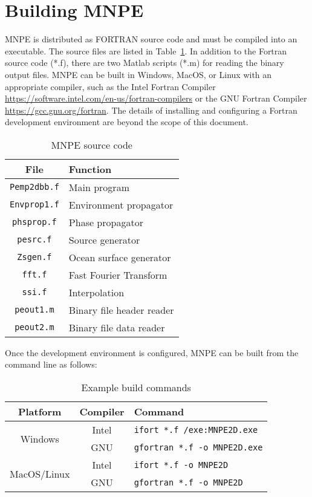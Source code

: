 \section{Building MNPE}

MNPE is distributed as FORTRAN source code and must be compiled into an executable. The source files are listed in Table~\ref{tab:sourcecode}. In addition to the Fortran source code (*.f), there are two Matlab scripts (*.m) for reading the binary output files. MNPE can be built in Windows, MacOS, or Linux with an appropriate compiler, such as the Intel Fortran Compiler \url{https://software.intel.com/en-us/fortran-compilers} or the GNU Fortran Compiler \url{https://gcc.gnu.org/fortran}. The details of installing and configuring a Fortran development environment are beyond the scope of this document.

\begin{table}[!ht]
	\begin{center}
		\caption{MNPE source code}
		\label{tab:sourcecode}
		\begin{tabular}{c|l}
			\textbf{File} & \textbf{Function} \\
			\hline
			\texttt{Pemp2dbb.f} & Main program \\
    		\texttt{Envprop1.f} & Environment propagator \\
    		\texttt{phsprop.f} & Phase propagator \\
    		\texttt{pesrc.f} & Source generator \\
    		\texttt{Zsgen.f} & Ocean surface generator \\
    		\texttt{fft.f} & Fast Fourier Transform \\
    		\texttt{ssi.f} & Interpolation \\
    		\texttt{peout1.m} & Binary file header reader \\
    		\texttt{peout2.m} & Binary file data reader \\
		\end{tabular}
	\end{center}
\end{table}

Once the development environment is configured, MNPE can be built from the command line as follows:

\begin{table}[!ht]
	\begin{center}
		\caption{Example build commands}
		\label{tab:typeenum}
		\begin{tabular}{c|c|l} 
			\textbf{Platform} & \textbf{Compiler} & \textbf{Command}\\
			\hline
			\multirow{2}{*}{Windows} & Intel & \texttt{ifort *.f /exe:MNPE2D.exe} \\
			& GNU & \texttt{gfortran *.f -o MNPE2D.exe} \\
			\multirow{2}{*}{MacOS/Linux} & Intel &  \texttt{ifort *.f -o MNPE2D}\\
			& GNU & \texttt{gfortran *.f -o MNPE2D} \\
		\end{tabular}
	\end{center}
\end{table}

